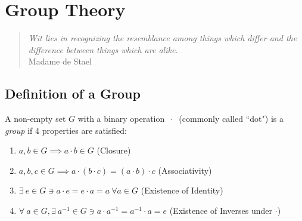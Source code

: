 \chapter{Group Theory}
\begin{quote}
    \textit{Wit lies in recognizing the resemblance among things which differ and the difference between things which are alike.}\\

Madame de Stael
\end{quote}
\section{Definition of a Group}
\begin{definition}[Group]
A non-empty set $G$ with a binary operation $\ \cdot \ $ (commonly called ``dot") is a \textit{group} if 4 properties are satisfied:
\begin{enumerate}
    \item $a,b\in G \implies a\cdot b \in G$ (Closure)
    \item $a,b,c\in G\implies a\cdot(b\cdot c)=(a\cdot b)\cdot c$ (Associativity)
    \item $\exists \ e \in G\ni a\cdot e=e\cdot a=a \ \forall a \in G$ (Existence of Identity)
    \item $\forall \ a\in G, \exists \ a^{-1}\in G\ni a\cdot a^{-1}=a^{-1}\cdot a = e$ (Existence of Inverses under $\cdot$)
\end{enumerate}
\end{definition}



